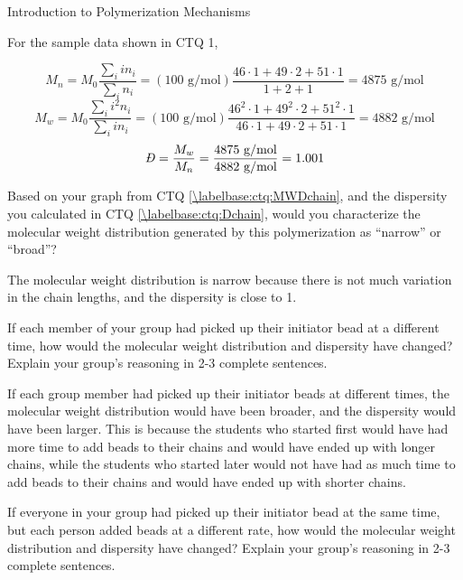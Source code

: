 \begin{activity}{Introduction to Polymerization Mechanisms}
\begin{ctqs}
\begin{solution}[2.5in]{}
			For the sample data shown in CTQ 1,
			
			\begin{equation*}
				M_n = M_0\frac{\sum_i i n_i}{\sum_i n_i} = (100\text{ g/mol})\frac{46\cdot 1 + 49\cdot 2 + 51\cdot 1}{1+2+1} = 4875\text{ g/mol}
			\end{equation*}
			\begin{equation*}
				M_w = M_0\frac{\sum_i i^2 n_i}{\sum_i i n_i} = (100\text{ g/mol})\frac{46^2\cdot 1 + 49^2\cdot 2 + 51^2\cdot 1}{46\cdot 1 + 49\cdot 2 + 51\cdot 1} = 4882\text{ g/mol}
			\end{equation*}
			\begin{equation*}
				\PDImath = \frac{M_w}{M_n} = \frac{4875\text{ g/mol}}{4882\text{ g/mol}} = 1.001
			\end{equation*}
		\end{solution}
	
	\question Based on your graph from CTQ \ref{\labelbase:ctq:MWDchain}, and the dispersity you calculated in CTQ \ref{\labelbase:ctq:Dchain}, would you characterize the molecular weight distribution generated by this polymerization as ``narrow'' or ``broad''?  %
	
		\begin{solution}[1in]{}
			The molecular weight distribution is narrow because there is not much variation in the chain lengths, and the dispersity is close to 1.
		\end{solution}
	
	\question If each member of your group had picked up their initiator bead at a different time, how would the molecular weight distribution and dispersity have changed?  Explain your group's reasoning in 2-3 complete sentences.
	
		\begin{solution}[1.9in]{}
			If each group member had picked up their initiator beads at different times, the molecular weight distribution would have been broader, and the dispersity would have been larger.  This is because the students who started first would have had more time to add beads to their chains and would have ended up with longer chains, while the students who started later would not have had as much time to add beads to their chains and would have ended up with shorter chains.
		\end{solution}
	
	\question If everyone in your group had picked up their initiator bead at the same time, but each person added beads at a different rate, how would the molecular weight distribution and dispersity have changed?  Explain your group's reasoning in 2-3 complete sentences.
	

\end{ctqs}
\end{activity}
